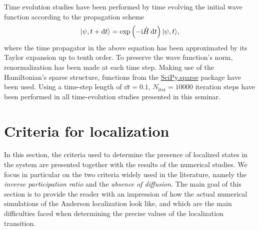 \documentclass[10pt,a4paper]{article}
\begin{document}
Time evolution studies have been performed by time evolving the initial wave function according to the propagation scheme
\begin{equation}\label{eq:propagation}
\vert\psi, t+\mathrm{d}t\rangle=\exp\left(-\mathrm{i}\hat{H}\,\mathrm{d} t\right)\vert\psi, t\rangle,
\end{equation}
where the time propagator in the above equation has been approximated by its Taylor expansion up to tenth order. To preserve the wave function's norm, renormalization has been made at each time step. Making use of the Hamiltonian's sparse structure, functions from the \url{SciPy.sparse} package have been used. Using a time-step length of $\dd t=0.1$, $N_\mathrm{iter}=10000$ iteration steps have been performed in all time-evolution studies presented in this seminar.   
 \section{Criteria for localization}
 \label{sec:criteria}
In this section, the criteria used to determine the presence of localized states in the system are presented together with the results of the numerical studies. We focus in particular on the two criteria widely used in the literature, namely the \emph{inverse participation ratio} and the \emph{absence of diffusion}. The main goal of this section is to provide the reader with an impression of how the actual numerical simulations of the Anderson localization look like, and which are the main difficulties faced when determining the precise values of the localization transition.
\end{document}
